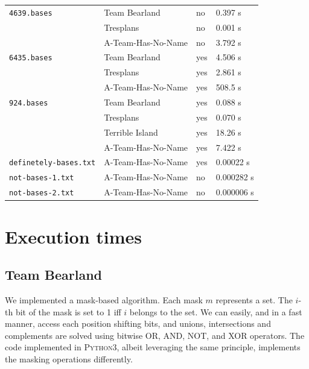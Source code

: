\documentclass[11pt]{amsart}
\begin{document}
\begin{center}
\begin{tabular}[c]{llll}
    \\\hline
      \texttt{4639.bases}
    & Team Bearland
    & no
    & 0.397 s
    \\
    & Tresplans
    & no
    & 0.001 s
    \\
    & A-Team-Has-No-Name
    & no
    & 3.792 s
    \\\hline
    \texttt{6435.bases}
    & Team Bearland
    & yes
    & 4.506 s
    \\
    & Tresplans
    & yes
    & 2.861 s
    \\
    & A-Team-Has-No-Name
    & yes
    & 508.5 s
    \\\hline
    \texttt{924.bases}
    & Team Bearland
    & yes
    & 0.088 s
    \\
    & Tresplans
    & yes
    & 0.070 s
    \\
    & Terrible Island
    & yes
    & 18.26 s
    \\
    & A-Team-Has-No-Name
    & yes
    & 7.422 s
    \\\hline
    \texttt{definetely-bases.txt}
    & A-Team-Has-No-Name
    & yes
    & 0.00022 s
    \\\hline
    \texttt{not-bases-1.txt}
    & A-Team-Has-No-Name
    & no
    & 0.000282 s
    \\\hline
    \texttt{not-bases-2.txt}
    & A-Team-Has-No-Name
    & no
    & 0.000006 s
    \\\hline    
  \end{tabular}
\end{center}

\section{Execution times}

\subsection{Team Bearland}

We implemented a mask-based algorithm.
Each mask $m$ represents a set.
The $i$-th bit of the mask is set to 1 iff $i$ belongs to the set.
We can easily, and in a fast manner, access each position shifting bits, and unions, intersections and complements are solved using bitwise OR, AND, NOT, and XOR operators.
The code implemented in \textsc{Python3}, albeit leveraging the same principle, implements the masking operations differently.
 
\end{document}
